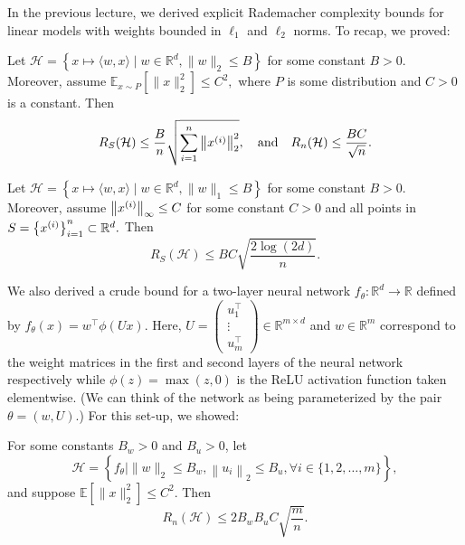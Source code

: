 \setcounter{section}{0}


In the previous lecture, we derived explicit Rademacher complexity bounds for linear models with weights bounded in $\ell_1$ and $\ell_2$ norms. To recap, we proved:

\begin{theorem}\label{lec8:thm:thm7.1}
Let $\mathcal{H}=\left\{x \mapsto\langle w, x\rangle \mid w \in \mathbb{R}^{d},\|w\|_{2} \leq B\right\}$ for some constant $B>0 .$ Moreover, assume $\mathbb{E}_{x \sim P}\left[\|x\|_{2}^{2}\right] \leq C^{2},$ where $P$ is some distribution and $C>0$ is a constant. Then
\begin{equation}
R_{S}(\mathcal{H}) \leq \frac{B}{n} \sqrt{\sum_{i=1}^{n}\left\|x\sp{i}\right\|_{2}^{2}}, \quad\text{and}\quad 
R_n(\mathcal{H}) \leq \frac{BC}{\sqrt{n}}.
\end{equation}
\end{theorem}

\begin{theorem}\label{lec8:thm:thm7.3}
Let $\mathcal{H}=\left\{x \mapsto\langle w, x\rangle \mid w \in \mathbb{R}^{d},\|w\|_{1} \leq B\right\}$ for some constant $B>0$. Moreover, assume $\left\|x\sp{i}\right\|_{\infty} \leq C$ for some constant $C>0$ and all points in $S=\left\{x\sp{i}\right\}_{i=1}^{n} \subset \mathbb{R}^{d} .$ Then
\begin{equation}
R_{S}(\mathcal{H}) \leq B C \sqrt{\frac{2 \log (2 d)}{n}}.
\end{equation}
\end{theorem}

We also derived a crude bound for a two-layer neural network $f_{\theta}: \mathbb{R}^d \to \mathbb{R}$ defined by $f_{\theta}(x) = w^\top \phi (Ux)$. Here, $U = \begin{pmatrix}
u_1^\top \\
\vdots \\
u_m^\top
\end{pmatrix} \in \mathbb{R}^{m \times d}$ and $w \in \mathbb{R}^m$ correspond to the weight matrices in the first and second layers of the neural network respectively while $\phi(z) = \max(z, 0)$ is the ReLU activation function taken elementwise. (We can think of the network as being parameterized by the pair $\theta = (w, U)$.) For this set-up, we showed:

\begin{theorem}\label{lec8:thm:thm7.5}
For some constants $B_{w}>0$ and $B_{u}>0$, let
\begin{equation}
\mathcal{H}=\left\{f_{\theta} \mid\|w\|_{2} \leq B_{w},\left\|u_{i}\right\|_{2} \leq B_{u}, \forall i \in\{1,2, \ldots, m\}\right\}, \label{lec8:eqn:old-bound-class}
\end{equation}
and suppose $\mathbb{E}\left[\|x\|_{2}^{2}\right] \leq C^{2} .$ Then
\begin{equation}
R_{n}(\mathcal{H}) \leq 2 B_{w} B_{u} C \sqrt{\frac{m}{n}}.
\end{equation}
\end{theorem}

